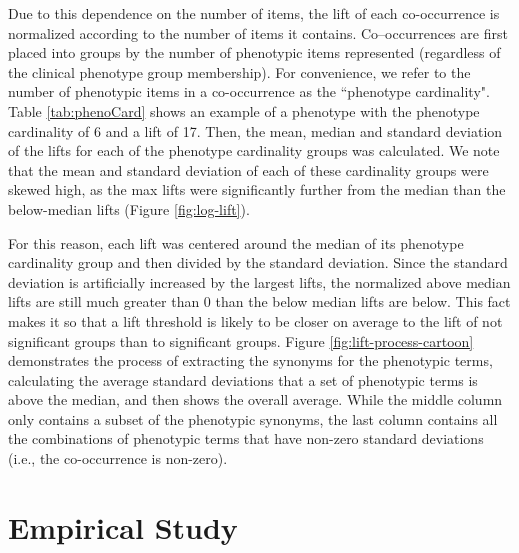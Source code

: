 \documentclass{sig-alternate-05-2015}
\begin{document}
Due to this dependence on the number of items, the lift of each co-occurrence is normalized according to the number of items it contains.
Co--occurrences are first placed into groups by the number of phenotypic items represented (regardless of the clinical phenotype group membership).
For convenience, we refer to the number of phenotypic items in a co-occurrence as the ``phenotype cardinality".
Table \ref{tab:phenoCard} shows an example of a phenotype with the phenotype cardinality of 6 and a lift of 17. 
Then, the mean, median and standard deviation of the lifts for each of the phenotype cardinality groups was calculated.
We note that the mean and standard deviation of each of these cardinality groups were skewed high, as the max lifts were significantly further from the median than the below-median lifts (Figure \ref{fig:log-lift}).

For this reason, each lift was centered around the median of its phenotype cardinality group and then divided by the standard deviation.
Since the standard deviation is artificially increased by the largest lifts, the normalized above median lifts are still much greater than 0 than the below median lifts are below. 
This fact makes it so that a lift threshold is likely to be closer on average to the lift of not significant groups than to significant groups.
Figure \ref{fig:lift-process-cartoon} demonstrates the process of extracting the synonyms for the phenotypic terms, calculating the average standard deviations that a set of phenotypic terms is above the median, and then shows the overall average.
While the middle column only contains a subset of the phenotypic synonyms, the last column contains all the combinations of phenotypic terms that have non-zero standard deviations (i.e., the co-occurrence is non-zero).


\section{Empirical Study}
\end{document}
